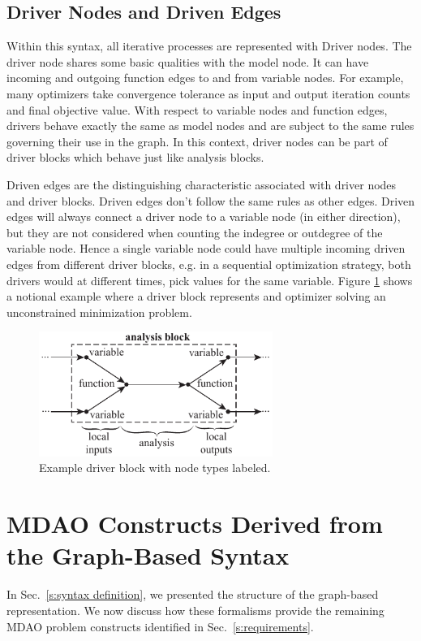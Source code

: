  \subsection{Driver Nodes and Driven Edges}
  Within this syntax, all iterative processes are represented with Driver nodes. 
  The driver node shares some basic qualities with the model node. It can have incoming 
  and outgoing function edges to and from variable nodes. For example, many optimizers take 
  convergence tolerance as input and output iteration counts and final objective value. 
  With respect to variable nodes and function edges, drivers behave exactly the same as
  model nodes and are subject to the same rules governing their use in the graph. In this
  context, driver nodes can be part of driver blocks which behave just like analysis 
  blocks. 

  Driven edges are the distinguishing characteristic associated with driver nodes and
  driver blocks. Driven edges don't follow the same rules as other edges. Driven edges  
  will always connect a driver node to a variable node (in either direction), but they 
  are not considered when counting the indegree or outdegree of the variable node.
  Hence a single variable node could have multiple incoming driven edges from different 
  driver blocks, e.g. in a sequential optimization strategy, both drivers would at 
  different times, pick values for the same variable. Figure \ref{f:driver block} shows 
  a notional example where a driver block represents and optimizer solving an 
  unconstrained minimization problem. 

  \begin{figure}[htb]
    \begin{center}
    \includegraphics[width=3.0in]{images/driver_block}
    \end{center}
    \vspace{-10pt}
  \caption{Example driver block with node types labeled.}
  \label{f:driver block}
  \end{figure}


\section{MDAO Constructs Derived from the Graph-Based Syntax}
  \label{s:graph representation}
  In Sec.~\ref{s:syntax definition}, we presented the structure of the graph-based 
  representation. We now discuss how these formalisms provide the remaining MDAO problem 
  constructs identified in Sec.~\ref{s:requirements}.

